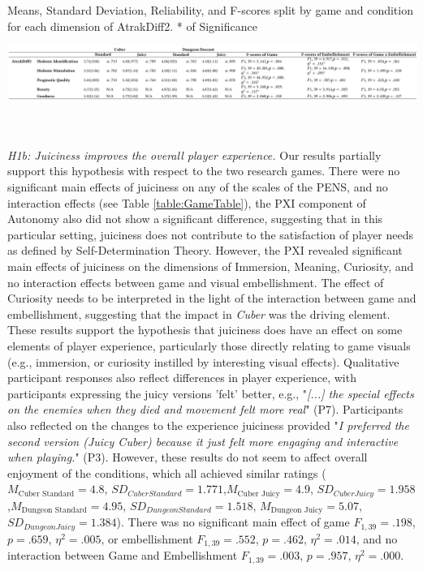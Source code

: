 \documentclass{sigchi}
\begin{document}
\begin{table}
  \caption{Means, Standard Deviation, Reliability, and F-scores split by game and condition for each dimension of AtrakDiff2. * of Significance}
  \label{table:PanasTable}
  	\includegraphics[width=\textwidth]{figures/PANAS_ATRAKDIFF2_Table}
\end{table}
\\\\
\textit{H1b: Juiciness improves the overall player experience.}
Our results partially support this hypothesis with respect to the two research games. There were no significant main effects of juiciness on any of the scales of the PENS, and no interaction effects (see Table \ref{table:GameTable}), the PXI component of Autonomy also did not show a significant difference, suggesting that in this particular setting, juiciness does not contribute to the satisfaction of player needs as defined by Self-Determination Theory. However, the PXI revealed significant main effects of juiciness on the dimensions of Immersion, Meaning, Curiosity, and no interaction effects between game and visual embellishment. The effect of Curiosity needs to be interpreted in the light of the interaction between game and embellishment, suggesting that the impact in \textit{Cuber} was the driving element. These results support the hypothesis that juiciness does have an effect on some elements of player experience, particularly those directly relating to game visuals (e.g., immersion, or curiosity instilled by interesting visual effects). Qualitative participant responses also reflect differences in player experience, with participants expressing the juicy versions 'felt' better, e.g., "\textit{[...] the special effects on the enemies when they died and movement felt more real}" (P7). Participants also reflected on the changes to the experience juiciness provided "\textit{I preferred the second version (Juicy Cuber) because it just felt more engaging and interactive when playing.}" (P3). However, these results do not seem to affect overall enjoyment of the conditions, which all achieved similar ratings ($M_\text{Cuber Standard}=4.8$, $SD_{Cuber Standard}=1.771$,$M_\text{Cuber Juicy}=4.9$, $SD_{Cuber Juicy}=1.958$,$M_\text{Dungeon Standard}=4.95$, $SD_{Dungeon Standard}=1.518$, $M_\text{Dungeon Juicy}=5.07$, $SD_{Dungeon Juicy}=1.384$). There was no significant main effect of game $F_{1,39} = .198$, $p = .659$, $\eta^2=.005$, or embellishment $F_{1,39} = .552$, $p = .462$, $\eta^2=.014$, and no interaction between Game and Embellishment $F_{1,39} = .003$, $p = .957$, $\eta^2=.000$. 
\end{document}
